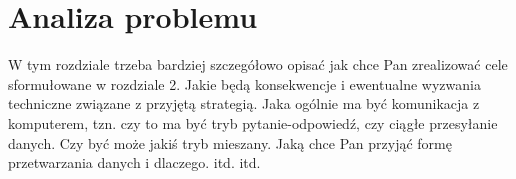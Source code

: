\chapter[Analiza problemu]{Analiza problemu}

\label{analiza_problemu}

W tym rozdziale trzeba bardziej szczegółowo opisać jak chce Pan
zrealizować cele sformułowane w rozdziale 2.
Jakie będą konsekwencje i ewentualne wyzwania techniczne
związane z przyjętą strategią. Jaka ogólnie ma być komunikacja
z komputerem, tzn. czy to ma być tryb pytanie-odpowiedź, czy ciągłe
przesyłanie danych. Czy być może jakiś tryb mieszany.
Jaką chce Pan przyjąć formę przetwarzania danych i dlaczego. itd. itd.
